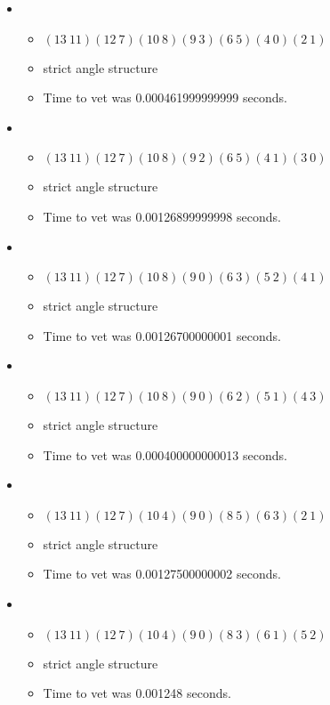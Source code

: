 \documentclass{article}
\begin{document}
\begin{itemize}
\begin{itemize}
\end{itemize}
\item \begin{itemize}
      \item $(13\ 11)(12\ 7)(10\ 8)(9\ 3)(6\ 5)(4\ 0)(2\ 1)$
      \item strict angle structure
      \item Time to vet was 0.000461999999999 seconds.
\end{itemize}
\item \begin{itemize}
      \item $(13\ 11)(12\ 7)(10\ 8)(9\ 2)(6\ 5)(4\ 1)(3\ 0)$
      \item strict angle structure
      \item Time to vet was 0.00126899999998 seconds.
\end{itemize}
\item \begin{itemize}
      \item $(13\ 11)(12\ 7)(10\ 8)(9\ 0)(6\ 3)(5\ 2)(4\ 1)$
      \item strict angle structure
      \item Time to vet was 0.00126700000001 seconds.
\end{itemize}
\item \begin{itemize}
      \item $(13\ 11)(12\ 7)(10\ 8)(9\ 0)(6\ 2)(5\ 1)(4\ 3)$
      \item strict angle structure
      \item Time to vet was 0.000400000000013 seconds.
\end{itemize}
\item \begin{itemize}
      \item $(13\ 11)(12\ 7)(10\ 4)(9\ 0)(8\ 5)(6\ 3)(2\ 1)$
      \item strict angle structure
      \item Time to vet was 0.00127500000002 seconds.
\end{itemize}
\item \begin{itemize}
      \item $(13\ 11)(12\ 7)(10\ 4)(9\ 0)(8\ 3)(6\ 1)(5\ 2)$
      \item strict angle structure
      \item Time to vet was 0.001248 seconds.
\end{itemize}

\end{itemize}
\end{document}
